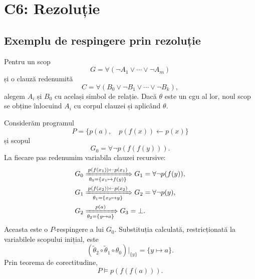 \section*{C6: Rezoluție}

\subsection{Exemplu de respingere prin rezoluție}

Pentru un scop
\[
	G=\forall(\neg A_1\lor\cdots\lor\neg A_m)
\]
și o clauză redenumită
\[
	C=\forall(B_0\lor\neg B_1\lor\cdots\lor\neg B_k),
\]
alegem $A_i$ și $B_0$ cu același simbol de relație. Dacă $\theta$ este
un cgu al lor, noul scop se obține înlocuind $A_i$ cu corpul clauzei și
aplicând $\theta$.

Considerăm programul
\[
	P=\bigl\{
		p(a),\quad
		p(f(x))\leftarrow p(x)
	\bigr\}
\]
și scopul
\[
	G_0=\forall\neg p(f(f(y))).
\]
La fiecare pas redenumim variabila clauzei recursive:
\[
	\begin{aligned}
	G_0
	&\xRightarrow[\theta_0=\{x_1\mapsto f(y)\}]
	{\,p(f(x_1))\leftarrow p(x_1)\,}
	G_1=\forall\neg p(f(y)),\\
	G_1
	&\xRightarrow[\theta_1=\{x_2\mapsto y\}]
	{\,p(f(x_2))\leftarrow p(x_2)\,}
	G_2=\forall\neg p(y),\\
	G_2
	&\xRightarrow[\theta_2=\{y\mapsto a\}]
	{\,p(a)\,}
	G_3=\bot.
	\end{aligned}
\]
Aceasta este o $P$-respingere a lui $G_0$. Substituția calculată,
restricționată la variabilele scopului inițial, este
\[
	(\widetilde{\theta}_2\circ\widetilde{\theta}_1\circ\theta_0)
	\big|_{\{y\}}=\{y\mapsto a\}.
\]
Prin teorema de corectitudine,
\[
	P\models p(f(f(a))).
\]

